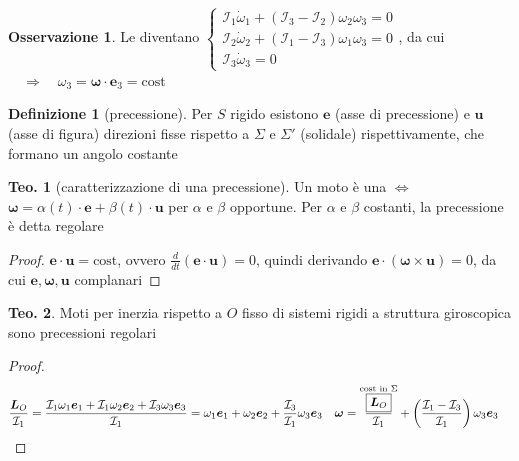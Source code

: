 \documentclass[a4paper,10pt]{article}
\theoremstyle{definition}
\theoremstyle{indentdefinition}
\newtheorem{defn}{Definizione}[section]
\theoremstyle{indenttheorem}
\newtheorem{thm}{Teo.}
\theoremstyle{myremark}
\newtheorem*{rem*}{Osservazione}
\theoremstyle{indentgeneral}
\begin{document}
\begin{rem*}
Le  diventano $\begin{cases}
\mathcal{I}_{1}\dot{\omega}_{1}+\left(\mathcal{I}_{3}-\mathcal{I}_{2}\right)\omega_{2}\omega_{3}=0\\
\mathcal{I}_{2}\dot{\omega}_{2}+\left(\mathcal{I}_{1}-\mathcal{I}_{3}\right)\omega_{1}\omega_{3}=0\\
\mathcal{I}_{3}\dot{\omega}_{3}=0
\end{cases}$, da cui $\quad\Rightarrow\quad\omega_{3}=\boldsymbol{\omega}\cdot\boldsymbol{e}_{3}=\text{cost}$
\end{rem*}
\begin{defn}[precessione]
\label{def:precessione}Per $S$ rigido esistono $\boldsymbol{e}$
(asse di precessione) e $\boldsymbol{u}$ (asse di figura) direzioni
fisse rispetto a $\Sigma$ e $\Sigma'$ (solidale) rispettivamente,
che formano un angolo costante
\end{defn}

\begin{thm}[caratterizzazione di una precessione]
Un moto è una  $\Longleftrightarrow$ $\boldsymbol{\omega}=\alpha\left(t\right)\cdot\boldsymbol{e}+\beta\left(t\right)\cdot\boldsymbol{u}$
per $\alpha$ e $\beta$ opportune. Per $\alpha$ e $\beta$ costanti,
la precessione è detta regolare
\end{thm}

\begin{proof}
$\boldsymbol{e}\cdot\boldsymbol{u}=\text{cost}$, ovvero $\frac{d}{dt}\left(\boldsymbol{e}\cdot\boldsymbol{u}\right)=0$,
quindi derivando $\boldsymbol{e}\cdot\left(\boldsymbol{\omega}\times\boldsymbol{u}\right)=0$,
da cui $\boldsymbol{e},\boldsymbol{\omega},\boldsymbol{u}$ complanari
\end{proof}
\begin{thm}
Moti per inerzia rispetto a $O$ fisso di sistemi rigidi a struttura
giroscopica sono precessioni regolari
\end{thm}

\begin{proof}
\begin{align*}
\frac{\boldsymbol{L}_{O}}{\mathcal{I}_{1}} & =\frac{\mathcal{I}_{1}\omega_{1}\boldsymbol{e}_{1}+\mathcal{I}_{1}\omega_{2}\boldsymbol{e}_{2}+\mathcal{I}_{3}\omega_{3}\boldsymbol{e}_{3}}{\mathcal{I}_{1}}=\omega_{1}\boldsymbol{e}_{1}+\omega_{2}\boldsymbol{e}_{2}+\frac{\mathcal{I}_{3}}{\mathcal{I}_{1}}\omega_{3}\boldsymbol{e}_{3} & \boldsymbol{\omega} & =\overset{\text{cost in \ensuremath{\Sigma}}}{\frac{\boxed{\boldsymbol{L}_{O}}}{\mathcal{I}_{1}}}+\left(\frac{\mathcal{I}_{1}-\mathcal{I}_{3}}{\mathcal{I}_{1}}\right)\omega_{3}\boldsymbol{e}_{3}
\end{align*}
\end{proof}
\end{document}
